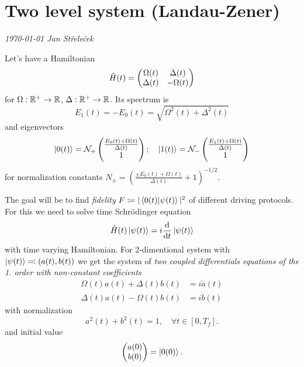 \chapter{Two level system (Landau-Zener)}
\textit{\today\newline
Jan Střeleček\newline}




Let's have a Hamiltonian
\begin{equation}
    \hat{H}(t)=\begin{pmatrix}
        \Omega(t)&\Delta(t)\\
        \Delta(t)&-\Omega(t)
    \end{pmatrix}
\end{equation}
for $\Omega: \mathbb{R}^+\rightarrow \mathbb{R}$, $\Delta: \mathbb{R}^+\rightarrow \mathbb{R}$. Its spectrum is
\begin{equation}
    E_1(t)=-E_0(t)= \sqrt{\Omega^2(t)+\Delta^2(t)}
    \label{eq:energy}
\end{equation}
and eigenvectors
\begin{equation}
\ket{0(t)}=\mathcal N_+ \begin{pmatrix}
 \frac{E_0(t)+\Omega(t)}{\Delta(t)} \\ 1
\end{pmatrix};\quad \ket{1(t)}=\mathcal N_-\begin{pmatrix}
    \frac{E_1(t)+\Omega(t)}{\Delta(t)} \\ 1
   \end{pmatrix}
   \label{eq:eigenvectors}
\end{equation}
for normalization constants $N_\pm=\left(\frac{\pm E_0(t)+\Omega(t)}{\Delta(t)}+1\right)^{-1/2}$.

The goal will be to find \emph{fidelity} $F\coloneqq |\braket{0(t)|\psi(t)}|^2$ of different driving protocols. For this we need to solve time Schr\"odinger equation
\begin{equation}
    \hat{H}(t)\ket{\psi(t)}=i\frac{\mathrm{d}}{\mathrm{d} t}\ket{\psi(t)}
\end{equation}
with time varying Hamiltonian. For 2-dimentional system with $\ket{\psi(t)}\eqqcolon (a(t),b(t))$ we get the system of \emph{two coupled differentials equations of the 1. order with non-constant coefficients}
\begin{align}
    \Omega(t)a(t)+\Delta(t)b(t)&=i\dot a(t)\label{eq:a1}\\
    \Delta(t)a(t)-\Omega(t)b(t)&=i\dot b(t)
    \label{eq:a2}
\end{align}
with normalization
\begin{equation}
    a^2(t)+b^2(t)=1, \quad \forall t\in [0,T_f].
    \label{eq:normalizationCondition}
\end{equation}
and initial value 
\begin{equation}
    \begin{pmatrix}
        a(0)\\b(0)
    \end{pmatrix} = \ket{0(0)}.
\end{equation}

